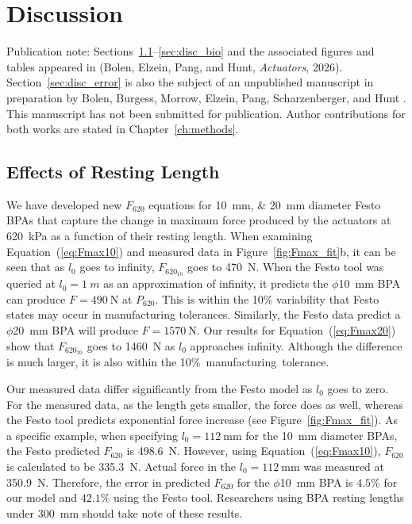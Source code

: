 \chapter{Discussion}\label{ch:discussion}
\graphicspath{{figs/40-discussion/}}

{\doublespacing\normalsize\upshape
\noindent Publication note: Sections~\ref{sec:disc_effects}--\ref{sec:disc_bio} and the associated figures and tables appeared in \citet{bolen_2026} (Bolen, Elzein, Pang, and Hunt, \emph{Actuators}, 2026). Section~\ref{sec:disc_error} is also the subject of an unpublished manuscript in preparation by Bolen, Burgess, Morrow, Elzein, Pang, Scharzenberger, and Hunt \citep{bolen_isometric_2025}. This manuscript has not been submitted for publication. Author contributions for both works are stated in Chapter~\ref{ch:methods}.\par}


\section{Effects of Resting Length}\label{sec:disc_effects}
We have developed new $F_{620}$ equations for \qtylist{10;20}{\mm} diameter Festo BPAs that capture the change in maximum force produced by the actuators at  \qty{620}{\kPa} as a function of their resting length. When examining Equation~(\ref{eq:Fmax10}) and measured data in Figure~\ref{fig:Fmax_fit}b, it can be seen that as $l_0$ goes to infinity, $F_{620_{10}}$ goes to \qty{470}{\N}. When the Festo tool \citep{lang_robert_musclesim_2005} was queried at $l_0=\qty{1}{m}$ as an approximation of infinity, it predicts the $\phi$\qty{10}{\mm} BPA can produce $F=\qty{490}{\N}$ at $P_{620}$. This is within the 10\% variability that Festo states may occur in manufacturing tolerances. Similarly, the Festo data predict a $\phi$\qty{20}{\mm} BPA will produce $F=\qty{1570}{\N}$. Our results for Equation~(\ref{eq:Fmax20}) show that  $F_{620_{20}}$ goes to \qty{1460}{\N} as $l_0$ approaches infinity. Although the difference is much larger, it is also within the \mbox{10\% manufacturing tolerance. }

Our measured data differ significantly from the Festo model as $l_0$ goes to zero. For the measured data, as the length gets smaller, the force does as well, whereas the Festo tool predicts exponential force increase (see Figure~\ref{fig:Fmax_fit}). As a specific example, when specifying $l_0=\qty{112}{\mm}$ for the \qtylist{10}{\mm} diameter BPAs, the Festo predicted $F_{620}$ is \qtylist{498.6}{\N}. However, using Equation~(\ref{eq:Fmax10}), $F_{620}$ is calculated to be \qtylist{335.3}{\N}. Actual force in the $l_0=\qty{112}{\mm}$ was measured at \qtylist{350.9}{\N}. Therefore, the error in predicted $F_{620}$ for the $\phi$\qty{10}{\mm} BPA is $4.5\%$ for our model and $42.1\%$ using the Festo tool. Researchers using BPA resting lengths under \qty{300}{\mm} should take note of these results.

